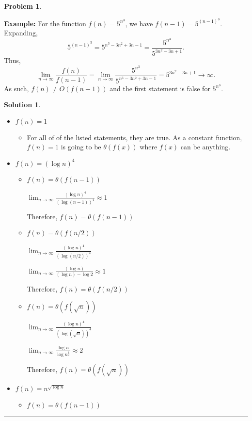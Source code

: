 \documentclass{article}
\theoremstyle{definition}
\newtheorem{problem}{Problem}
\def\fline{\rule{0.75\linewidth}{0.5pt}}
\newcommand{\finishline}{
  \begin{center}\fline
\end{center}}
\newtheorem*{solution*}{Solution}
\newenvironment{solution}{
\begin{solution*}}{{\finishline}
\end{solution*}}
\begin{document}
\begin{problem}
\begin{enumerate}
      \smallskip
      \textbf{Example:} For the function $f(n) = 5^{n^3}$, we have $f(n-1) = 5^{(n-1)^3}$. Expanding,
      \[
        5^{(n-1)^3} = 5^{n^3 - 3n^2 + 3n - 1} = \frac{5^{n^3}}{5^{3n^2 - 3n + 1}}.
      \]
      Thus,
      \[
        \lim_{n \to \infty}\frac{f(n)}{f(n-1)} = \lim_{n \to \infty} \frac{5^{n^3}}{5^{n^3 - 3n^2 + 3n - 1}} = 5^{3n^2 - 3n + 1} \to \infty.
      \]
      As such, $f(n) \neq O(f(n-1))$ and the first statement is false for $5^{n^3}$.

      \begin{solution}
        \

        \begin{itemize}
          \item $f(n) = 1$
            \begin{itemize}
              \item For all of of the listed statements, they are true. As a constant function, $f(n) = 1$ is going to be $\theta(f(x))$ where $f(x)$ can be anything.
            \end{itemize}
          \item $f(n) = (\log n)^4$
            \begin{itemize}

              \item $f(n) = \theta(f(n-1))$

                $\lim_{n \to \infty}\frac{(\log n)^4}{(\log (n-1))^4} \approx 1$

                Therefore, $f(n) = \theta(f(n-1))$
              \item $f(n) = \theta(f(n/2))$

                $\lim_{n \to \infty}\frac{(\log n)^4}{(\log (n/2))^4}$

                $\lim_{n \to \infty}\frac{(\log n)}{(\log n) - \log 2} \approx 1$

                Therefore, $f(n) = \theta(f(n/2))$
              \item $f(n) = \theta(f(\sqrt{n}))$

                $\lim_{n \to \infty}\frac{(\log n)^4}{(\log (\sqrt{n}))^4}$

                $\lim_{n \to \infty}\frac{\log n}{\log n^{\frac{1}{2}}} \approx 2$

                Therefore, $f(n) = \theta(f(\sqrt{n}))$
            \end{itemize}
          \item $f(n) = n^{\sqrt{\log n}}$
            \begin{itemize}
              \item $f(n) = \theta(f(n-1))$


\end{itemize}
\end{itemize}
\end{solution}
\end{enumerate}
\end{problem}
\end{document}
